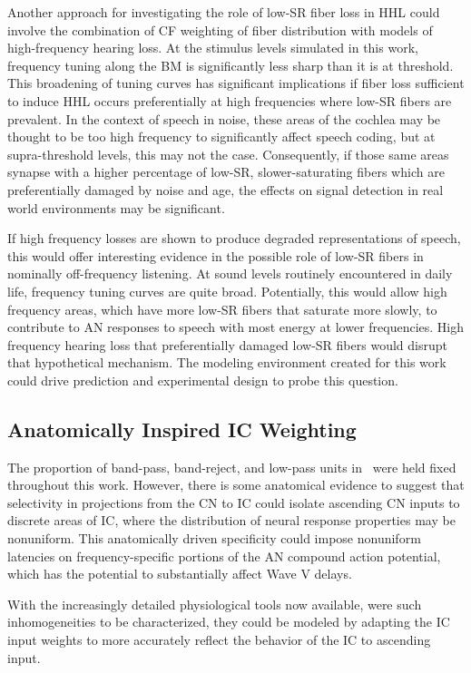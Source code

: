Another approach for investigating the role of low-SR fiber loss in HHL could involve the combination of CF weighting of fiber distribution with models of high-frequency hearing loss.  At the stimulus levels simulated in this work, frequency tuning along the BM is significantly less sharp than it is at threshold.  This broadening of tuning curves has significant implications if fiber loss sufficient to induce HHL occurs preferentially at high frequencies where low-SR fibers are prevalent.   In the context of speech in noise, these areas of the cochlea may be thought to be too high frequency to significantly affect speech coding, but at supra-threshold levels, this may not the case. Consequently, if those same areas synapse with a higher percentage of low-SR, slower-saturating fibers which are preferentially damaged by noise and age, the effects on signal detection in real world environments may be significant. 

If high frequency losses are shown to produce degraded representations of speech, this would offer interesting evidence in the possible role of low-SR fibers in nominally off-frequency listening.  At sound levels routinely encountered in daily life, frequency tuning curves are quite broad.  Potentially, this would allow high frequency areas, which have more low-SR fibers that saturate more slowly, to contribute to AN responses to speech with most energy at lower frequencies.  High frequency hearing loss that preferentially damaged low-SR fibers would disrupt that hypothetical mechanism.  The modeling environment created for this work could drive prediction and experimental design to probe this question. 

\subsection{Anatomically Inspired IC Weighting} %
\label{sub:anatomically_inspired_brainstem_adaptation}
The proportion of band-pass, band-reject, and low-pass units in~\cite{Carney2015Speech} were held fixed throughout this work.  However, there is some anatomical evidence to suggest that selectivity in projections from the CN to IC could isolate ascending CN inputs to discrete areas of IC, where the distribution of neural response properties may be nonuniform.  This anatomically driven specificity could impose nonuniform latencies on frequency-specific portions of the AN compound action potential, which has the potential to substantially affect Wave V delays.

With the increasingly detailed physiological tools now available, were such inhomogeneities to be characterized, they could be modeled by adapting the IC input weights to more accurately reflect the behavior of the IC to ascending input. 

